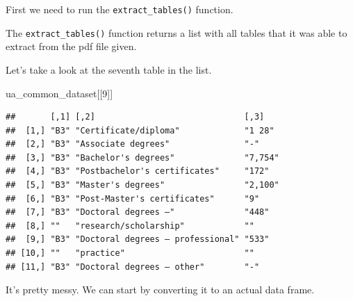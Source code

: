 \documentclass[
]{book}
\newenvironment{Shaded}{\begin{snugshade}}{\end{snugshade}}
\newcommand{\DecValTok}[1]{\textcolor[rgb]{0.00,0.00,0.81}{#1}}
\newcommand{\KeywordTok}[1]{\textcolor[rgb]{0.13,0.29,0.53}{\textbf{#1}}}
\newcommand{\NormalTok}[1]{#1}
\newcommand{\OperatorTok}[1]{\textcolor[rgb]{0.81,0.36,0.00}{\textbf{#1}}}
\newcommand{\StringTok}[1]{\textcolor[rgb]{0.31,0.60,0.02}{#1}}
\begin{document}
First we need to run the \texttt{extract\_tables()} function.

\begin{Shaded}
\end{Shaded}

The \texttt{extract\_tables()} function returns a list with all tables that it was able to extract from the pdf file given.

Let's take a look at the seventh table in the list.

\begin{Shaded}
\begin{Highlighting}[]
\NormalTok{ua_common_dataset[[}\DecValTok{9}\NormalTok{]]}
\end{Highlighting}
\end{Shaded}

\begin{verbatim}
##       [,1] [,2]                              [,3]   
##  [1,] "B3" "Certificate/diploma"             "1 28" 
##  [2,] "B3" "Associate degrees"               "-"    
##  [3,] "B3" "Bachelor's degrees"              "7,754"
##  [4,] "B3" "Postbachelor's certificates"     "172"  
##  [5,] "B3" "Master's degrees"                "2,100"
##  [6,] "B3" "Post-Master's certificates"      "9"    
##  [7,] "B3" "Doctoral degrees –"              "448"  
##  [8,] ""   "research/scholarship"            ""     
##  [9,] "B3" "Doctoral degrees – professional" "533"  
## [10,] ""   "practice"                        ""     
## [11,] "B3" "Doctoral degrees – other"        "-"
\end{verbatim}

It's pretty messy. We can start by converting it to an actual data frame.

\begin{Shaded}
\end{Shaded}
\end{document}

